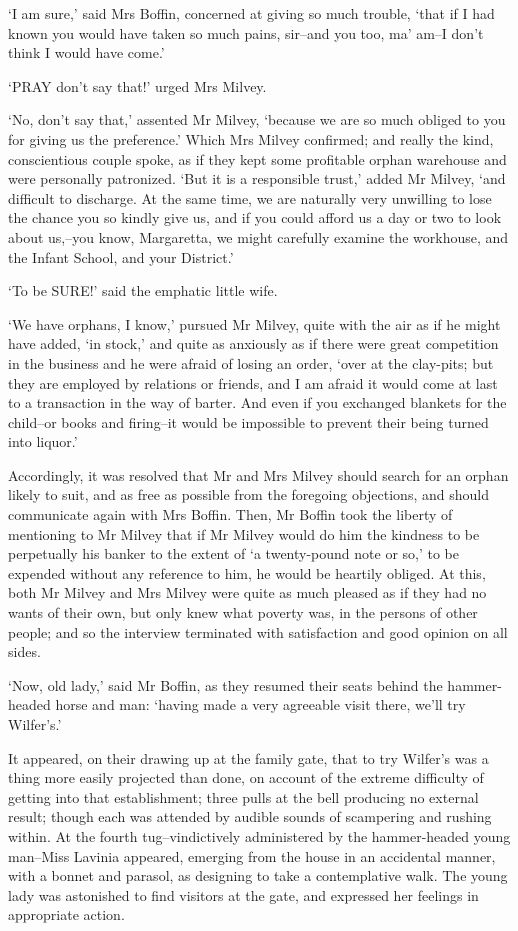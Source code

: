 ‘I am sure,’ said Mrs Boffin, concerned at giving so much trouble, ‘that
if I had known you would have taken so much pains, sir--and you too, ma’
am--I don’t think I would have come.’

‘PRAY don’t say that!’ urged Mrs Milvey.

‘No, don’t say that,’ assented Mr Milvey, ‘because we are so much
obliged to you for giving us the preference.’ Which Mrs Milvey
confirmed; and really the kind, conscientious couple spoke, as if they
kept some profitable orphan warehouse and were personally patronized.
‘But it is a responsible trust,’ added Mr Milvey, ‘and difficult to
discharge. At the same time, we are naturally very unwilling to lose the
chance you so kindly give us, and if you could afford us a day or two
to look about us,--you know, Margaretta, we might carefully examine the
workhouse, and the Infant School, and your District.’

‘To be SURE!’ said the emphatic little wife.

‘We have orphans, I know,’ pursued Mr Milvey, quite with the air as if
he might have added, ‘in stock,’ and quite as anxiously as if there were
great competition in the business and he were afraid of losing an order,
‘over at the clay-pits; but they are employed by relations or friends,
and I am afraid it would come at last to a transaction in the way of
barter. And even if you exchanged blankets for the child--or books
and firing--it would be impossible to prevent their being turned into
liquor.’

Accordingly, it was resolved that Mr and Mrs Milvey should search for
an orphan likely to suit, and as free as possible from the foregoing
objections, and should communicate again with Mrs Boffin. Then, Mr
Boffin took the liberty of mentioning to Mr Milvey that if Mr Milvey
would do him the kindness to be perpetually his banker to the extent
of ‘a twenty-pound note or so,’ to be expended without any reference
to him, he would be heartily obliged. At this, both Mr Milvey and Mrs
Milvey were quite as much pleased as if they had no wants of their own,
but only knew what poverty was, in the persons of other people; and
so the interview terminated with satisfaction and good opinion on all
sides.

‘Now, old lady,’ said Mr Boffin, as they resumed their seats behind the
hammer-headed horse and man: ‘having made a very agreeable visit there,
we’ll try Wilfer’s.’

It appeared, on their drawing up at the family gate, that to try
Wilfer’s was a thing more easily projected than done, on account of the
extreme difficulty of getting into that establishment; three pulls
at the bell producing no external result; though each was attended
by audible sounds of scampering and rushing within. At the fourth
tug--vindictively administered by the hammer-headed young man--Miss
Lavinia appeared, emerging from the house in an accidental manner, with
a bonnet and parasol, as designing to take a contemplative walk. The
young lady was astonished to find visitors at the gate, and expressed
her feelings in appropriate action.


